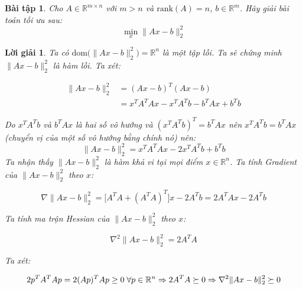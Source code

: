 \documentclass[14pt, a4paper]{article}
\theoremstyle{sltheorem}
\newtheorem{baitap}{Bài tập}
\theoremstyle{soltheorem}
\newtheorem*{loigiai}{Lời giải}
\begin{document}
    \begin{baitap}
        Cho $A \in \mathbb{R}^{m \times n}$ với $m > n$ và $\mathrm{rank}(A)=n$, $b \in \mathbb{R}^{m}$. Hãy giải bài toán tối ưu sau:
        \begin{equation*}
            \min_x \lVert Ax - b \rVert_2^2
        \end{equation*}
    \end{baitap}

    \begin{loigiai}
        Ta có $\mathrm{dom}\Big( \lVert Ax-b \rVert_2^2\Big)=\mathbb{R}^{n}$ là một tập lồi. Ta sẽ chứng minh
        $\lVert Ax - b \rVert_2^2$ là hàm lồi. Ta xét:

        \begin{equation*}
            \begin{aligned}
            \lVert Ax - b \rVert_2^2&=(Ax-b)^T(Ax-b)\\
            &=x^TA^TAx - x^TA^Tb - b^TAx + b^Tb
            \end{aligned}
        \end{equation*}

        Do $x^TA^Tb$ và $b^TAx$ là hai số vô hướng và $(x^TA^Tb)^T=b^TAx$ nên $x^TA^Tb=b^TAx$ (chuyển vị của một số vô hướng bằng chính nó) nên:
        \begin{equation*}
            \lVert Ax - b \rVert_2^2=x^TA^TAx - 2x^TA^Tb + b^Tb
        \end{equation*}
        Ta nhận thấy $\lVert Ax - b \rVert_2^2$ là hàm khả vi tại mọi điểm $x \in \mathbb{R}^n$. Ta tính Gradient của $\lVert Ax - b \rVert_2^2$ theo $x$:

        \begin{equation*}
            \nabla \lVert Ax - b \rVert_2^2=\Big\lbrack A^TA + (A^TA)^T \Big\rbrack x-2A^Tb=2A^TAx - 2A^Tb
        \end{equation*}

        Ta tính ma trận Hessian của $\lVert Ax - b \rVert_2^2$ theo $x$:

        \begin{equation*}
            \nabla^2 \lVert Ax - b \rVert_2^2=2A^TA
        \end{equation*}

        Ta xét:

        \begin{equation*}
            2p^TA^TAp=2(Ap)^TAp\geq0 \thickspace \forall p \in \mathbb{R}^{n} \Rightarrow 2A^TA \succeq 0 \Rightarrow \nabla^2 \lVert Ax - b \rVert_2^2 \succeq 0
        \end{equation*}


\end{loigiai}
\end{document}
